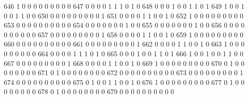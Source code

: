 \documentclass[compress,8pt]{beamer}
\begin{document}
\begin{frame}
\begin{Schunk}
  646      1       0   0              0        0    0       0       0   0   0
  647      0       0   0              0        1    1       1       0   1   0
  648      0       0   0              1        0    0       1       1   0   1
  649      1       0   0              1        0    0       1       1   0   0
  650      0       0   0              0        0    0       0       0   0   1
  651      0       0   0              0        1    1       0       0   1   0
  652      1       0   0              0        0    0       0       0   0   0
  653      0       0   0              0        0    0       0       0   0   0
  654      0       0   0              0        0    0       0       1   0   0
  655      0       0   0              0        0    0       0       1   0   0
  656      0       0   0              0        0    0       0       0   0   0
  657      0       0   0              0        0    0       0       0   0   1
  658      0       0   0              0        1    1       0       0   1   0
  659      1       0   0              0        0    0       0       0   0   0
  660      0       0   0              0        0    0       0       0   0   0
  661      0       0   0              0        0    0       0       0   0   1
  662      0       0   0              0        1    1       0       0   1   0
  663      1       0   0              0        0    0       0       0   0   0
  664      0       0   0              0        1    1       1       0   1   0
  665      0       0   0              1        0    0       1       1   0   1
  666      1       0   0              1        0    0       1       1   0   0
  667      0       0   0              0        0    0       0       0   0   1
  668      0       0   0              0        1    1       0       0   1   0
  669      1       0   0              0        0    0       0       0   0   0
  670      0       1   0              0        0    0       0       0   0   0
  671      0       1   0              0        0    0       0       0   0   0
  672      0       0   0              0        0    0       0       0   0   0
  673      0       0   0              0        0    0       0       0   0   1
  674      0       0   0              0        0    0       0       0   0   0
  675      0       1   0              0        1    1       0       0   1   0
  676      1       0   0              0        0    0       0       0   0   0
  677      0       1   0              0        0    0       0       0   0   0
  678      0       1   0              0        0    0       0       0   0   0
  679      0       0   0              0        0    0       0       0   0   0

\end{Schunk}
\end{frame}
\end{document}
